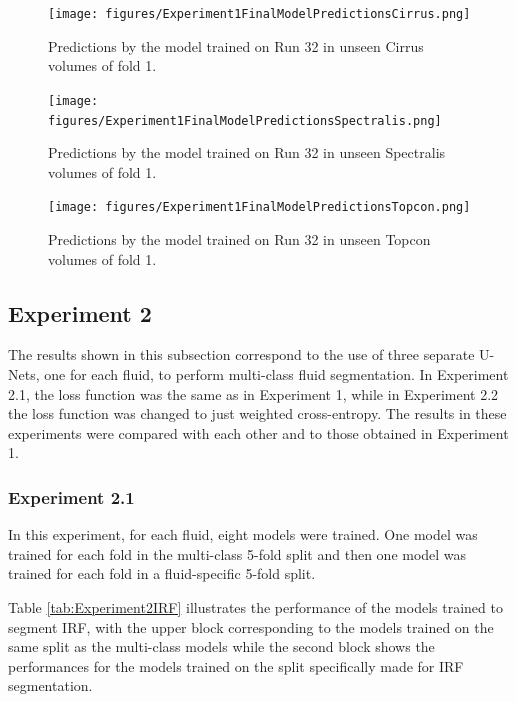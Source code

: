 \begin{figure}[!ht]
	\centering
	\texttt{[image: figures/Experiment1FinalModelPredictionsCirrus.png]}
	\caption{Predictions by the model trained on Run 32 in unseen Cirrus volumes of fold 1.}
	\label{fig:Experiment1FinalModelPredictionsCirrus}
\end{figure}

\begin{figure}[!ht]
	\centering
	\texttt{[image: figures/Experiment1FinalModelPredictionsSpectralis.png]}
	\caption{Predictions by the model trained on Run 32 in unseen Spectralis volumes of fold 1.}
	\label{fig:Experiment1FinalModelPredictionsSpectralis}
\end{figure}

\begin{figure}[!ht]
	\centering
	\texttt{[image: figures/Experiment1FinalModelPredictionsTopcon.png]}
	\caption{Predictions by the model trained on Run 32 in unseen Topcon volumes of fold 1.}
	\label{fig:Experiment1FinalModelPredictionsTopcon}
\end{figure}

\subsection{Experiment 2}
The results shown in this subsection correspond to the use of three separate U-Nets, one for each fluid, to perform multi-class fluid segmentation. In Experiment 2.1, the loss function was the same as in Experiment 1, while in Experiment 2.2 the loss function was changed to just weighted cross-entropy. The results in these experiments were compared with each other and to those obtained in Experiment 1.

\subsubsection{Experiment 2.1}
In this experiment, for each fluid, eight models were trained. One model was trained for each fold in the multi-class 5-fold split and then one model was trained for each fold in a fluid-specific 5-fold split.
\par
Table \ref{tab:Experiment2IRF} illustrates the performance of the models trained to segment IRF, with the upper block corresponding to the models trained on the same split as the multi-class models while the second block shows the performances for the models trained on the split specifically made for IRF segmentation.

